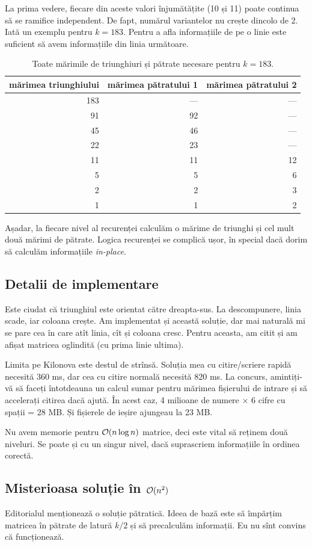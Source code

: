 \documentclass[../main.tex]{subfiles}
\begin{document}
La prima vedere, fiecare din aceste valori înjumătățite (10 și 11) poate continua să se ramifice independent. De fapt, numărul variantelor nu crește dincolo de 2. Iată un exemplu pentru $k = 183$. Pentru a afla informațiile de pe o linie este suficient să avem informațiile din linia următoare.

\begin{table}[H]
  \centering
  \begin{tabular}{rrr}
    mărimea triunghiului & mărimea pătratului 1 & mărimea pătratului 2\\
    \hline
    183 & --- & --- \\
    91 & 92 & --- \\
    45 & 46 & --- \\
    22 & 23 & --- \\
    11 & 11 & 12 \\
    5 & 5 & 6 \\
    2 & 2 & 3 \\
    1 & 1 & 2 \\
    \hline
  \end{tabular}

  \caption{Toate mărimile de triunghiuri și pătrate necesare pentru $k=183$.}
\end{table}

Așadar, la fiecare nivel al recurenței calculăm o mărime de triunghi și cel mult două mărimi de pătrate. Logica recurenței se complică ușor, în special dacă dorim să calculăm informațiile \textit{in-place}.

\subsection{Detalii de implementare}

Este ciudat că triunghiul este orientat către dreapta-sus. La descompunere, linia scade, iar coloana crește. Am implementat și această soluție, dar mai naturală mi se pare cea în care atît linia, cît și coloana cresc. Pentru aceasta, am citit și am afișat matricea oglindită (cu prima linie ultima).

Limita pe Kilonova este destul de strînsă. Soluția mea cu citire/scriere rapidă necesită 360 ms, dar cea cu citire normală necesită 820 ms. La concurs, amintiți-vă să faceți întotdeauna un calcul sumar pentru mărimea fișierului de intrare și să accelerați citirea dacă ajută. În acest caz, 4 milioane de numere × 6 cifre cu spații = 28 MB. Și fișierele de ieșire ajungeau la 23 MB.

Nu avem memorie pentru $\mathcal{O}(n \log n)$ matrice, deci este vital să reținem două niveluri. Se poate și cu un singur nivel, dacă suprascriem informațiile în ordinea corectă.

\subsection{Misterioasa soluție în \texorpdfstring{$\mathcal{O}(n^2)$}{O(n2)}}

Editorialul menționează o soluție pătratică. Ideea de bază este să împărțim matricea în pătrate de latură $k / 2$ și să precalculăm informații. Eu nu sînt convins că funcționează.
\end{document}
